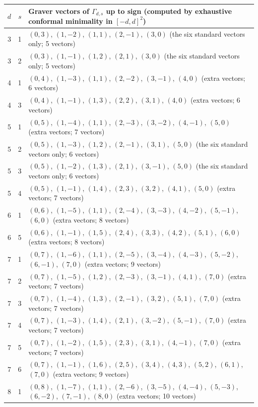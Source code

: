 \begin{longtable}{@{}rrp{9.2cm}@{}}
\toprule $d$ & $s$ & Graver vectors of $\Gamma_{d,s}$ up to sign (computed by exhaustive conformal minimality in $[-d,d]^2$)\\\midrule\endhead
3 & 1 & $(0,3)$, $(1,-2)$, $(1,1)$, $(2,-1)$, $(3,0)$ (the six standard vectors only; 5 vectors)\\
3 & 2 & $(0,3)$, $(1,-1)$, $(1,2)$, $(2,1)$, $(3,0)$ (the six standard vectors only; 5 vectors)\\
4 & 1 & $(0,4)$, $(1,-3)$, $(1,1)$, $(2,-2)$, $(3,-1)$, $(4,0)$ (extra vectors; 6 vectors)\\
4 & 3 & $(0,4)$, $(1,-1)$, $(1,3)$, $(2,2)$, $(3,1)$, $(4,0)$ (extra vectors; 6 vectors)\\
5 & 1 & $(0,5)$, $(1,-4)$, $(1,1)$, $(2,-3)$, $(3,-2)$, $(4,-1)$, $(5,0)$ (extra vectors; 7 vectors)\\
5 & 2 & $(0,5)$, $(1,-3)$, $(1,2)$, $(2,-1)$, $(3,1)$, $(5,0)$ (the six standard vectors only; 6 vectors)\\
5 & 3 & $(0,5)$, $(1,-2)$, $(1,3)$, $(2,1)$, $(3,-1)$, $(5,0)$ (the six standard vectors only; 6 vectors)\\
5 & 4 & $(0,5)$, $(1,-1)$, $(1,4)$, $(2,3)$, $(3,2)$, $(4,1)$, $(5,0)$ (extra vectors; 7 vectors)\\
6 & 1 & $(0,6)$, $(1,-5)$, $(1,1)$, $(2,-4)$, $(3,-3)$, $(4,-2)$, $(5,-1)$, $(6,0)$ (extra vectors; 8 vectors)\\
6 & 5 & $(0,6)$, $(1,-1)$, $(1,5)$, $(2,4)$, $(3,3)$, $(4,2)$, $(5,1)$, $(6,0)$ (extra vectors; 8 vectors)\\
7 & 1 & $(0,7)$, $(1,-6)$, $(1,1)$, $(2,-5)$, $(3,-4)$, $(4,-3)$, $(5,-2)$, $(6,-1)$, $(7,0)$ (extra vectors; 9 vectors)\\
7 & 2 & $(0,7)$, $(1,-5)$, $(1,2)$, $(2,-3)$, $(3,-1)$, $(4,1)$, $(7,0)$ (extra vectors; 7 vectors)\\
7 & 3 & $(0,7)$, $(1,-4)$, $(1,3)$, $(2,-1)$, $(3,2)$, $(5,1)$, $(7,0)$ (extra vectors; 7 vectors)\\
7 & 4 & $(0,7)$, $(1,-3)$, $(1,4)$, $(2,1)$, $(3,-2)$, $(5,-1)$, $(7,0)$ (extra vectors; 7 vectors)\\
7 & 5 & $(0,7)$, $(1,-2)$, $(1,5)$, $(2,3)$, $(3,1)$, $(4,-1)$, $(7,0)$ (extra vectors; 7 vectors)\\
7 & 6 & $(0,7)$, $(1,-1)$, $(1,6)$, $(2,5)$, $(3,4)$, $(4,3)$, $(5,2)$, $(6,1)$, $(7,0)$ (extra vectors; 9 vectors)\\
8 & 1 & $(0,8)$, $(1,-7)$, $(1,1)$, $(2,-6)$, $(3,-5)$, $(4,-4)$, $(5,-3)$, $(6,-2)$, $(7,-1)$, $(8,0)$ (extra vectors; 10 vectors)\\

\end{longtable}
